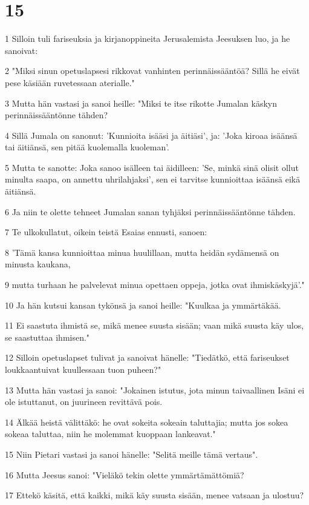 \chapter{15}

\par 1 Silloin tuli fariseuksia ja kirjanoppineita Jerusalemista Jeesuksen luo, ja he sanoivat:
\par 2 "Miksi sinun opetuslapsesi rikkovat vanhinten perinnäissääntöä? Sillä he eivät pese käsiään ruvetessaan aterialle."
\par 3 Mutta hän vastasi ja sanoi heille: "Miksi te itse rikotte Jumalan käskyn perinnäissääntönne tähden?
\par 4 Sillä Jumala on sanonut: 'Kunnioita isääsi ja äitiäsi', ja: 'Joka kiroaa isäänsä tai äitiänsä, sen pitää kuolemalla kuoleman'.
\par 5 Mutta te sanotte: Joka sanoo isälleen tai äidilleen: 'Se, minkä sinä olisit ollut minulta saapa, on annettu uhrilahjaksi', sen ei tarvitse kunnioittaa isäänsä eikä äitiänsä.
\par 6 Ja niin te olette tehneet Jumalan sanan tyhjäksi perinnäissääntönne tähden.
\par 7 Te ulkokullatut, oikein teistä Esaias ennusti, sanoen:
\par 8 'Tämä kansa kunnioittaa minua huulillaan, mutta heidän sydämensä on minusta kaukana,
\par 9 mutta turhaan he palvelevat minua opettaen oppeja, jotka ovat ihmiskäskyjä'."
\par 10 Ja hän kutsui kansan tykönsä ja sanoi heille: "Kuulkaa ja ymmärtäkää.
\par 11 Ei saastuta ihmistä se, mikä menee suusta sisään; vaan mikä suusta käy ulos, se saastuttaa ihmisen."
\par 12 Silloin opetuslapset tulivat ja sanoivat hänelle: "Tiedätkö, että fariseukset loukkaantuivat kuullessaan tuon puheen?"
\par 13 Mutta hän vastasi ja sanoi: "Jokainen istutus, jota minun taivaallinen Isäni ei ole istuttanut, on juurineen revittävä pois.
\par 14 Älkää heistä välittäkö: he ovat sokeita sokeain taluttajia; mutta jos sokea sokeaa taluttaa, niin he molemmat kuoppaan lankeavat."
\par 15 Niin Pietari vastasi ja sanoi hänelle: "Selitä meille tämä vertaus".
\par 16 Mutta Jeesus sanoi: "Vieläkö tekin olette ymmärtämättömiä?
\par 17 Ettekö käsitä, että kaikki, mikä käy suusta sisään, menee vatsaan ja ulostuu?
